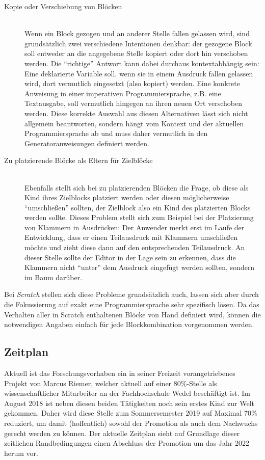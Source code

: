 \documentclass[paper=a4,fontsize=11pt,parskip=half]{scrartcl}
\begin{document}
\begin{description}
\item[Kopie oder Verschiebung von Blöcken] \hfill\\
  Wenn ein Block gezogen und an anderer Stelle fallen gelassen wird, sind grundsätzlich zwei verschiedene Intentionen denkbar: der gezogene Block soll entweder an die angegebene Stelle kopiert oder dort hin verschoben werden. Die \enquote{richtige} Antwort kann dabei durchaus kontextabhängig sein: Eine deklarierte Variable soll, wenn sie in einem Ausdruck fallen gelassen wird, dort vermutlich eingesetzt (also kopiert) werden. Eine konkrete Anweisung in einer imperativen Programmiersprache, z.B. eine Textausgabe, soll vermutlich hingegen an ihren neuen Ort verschoben werden. Diese korrekte Auswahl aus diesen Alternativen lässt sich nicht allgemein beantworten, sondern hängt vom Kontext und der aktuellen Programmiersprache ab und muss daher vermutlich in den Generatoranweisungen definiert werden.
\item[Zu platzierende Blöcke als Eltern für Zielblöcke] \hfill\\
  Ebenfalls stellt sich bei zu platzierenden Blöcken die Frage, ob diese als Kind ihres Zielblocks platziert werden oder diesen möglicherweise \enquote{umschließen} sollten, der Zielblock also ein Kind des platzierten Blocks werden sollte. Dieses Problem stellt sich zum Beispiel bei der Platzierung von Klammern in Ausdrücken: Der Anwender merkt erst im Laufe der Entwicklung, dass er einen Teilausdruck mit Klammern umschließen möchte und zieht diese dann auf den entsprechenden Teilausdruck. An dieser Stelle sollte der Editor in der Lage sein zu erkennen, dass die Klammern nicht \enquote{unter} dem Ausdruck eingefügt werden sollten, sondern im Baum darüber.
\end{description}

Bei \textit{Scratch} stellen sich diese Probleme grundsätzlich auch, lassen sich aber durch die Fokussierung auf exakt eine Programmiersprache sehr spezifisch lösen. Da das Verhalten aller in Scratch enthaltenen Blöcke von Hand definiert wird, können die notwendigen Angaben einfach für jede Blockkombination vorgenommen werden.

\subsection{Zeitplan}

Aktuell ist das Forschungsvorhaben ein in seiner Freizeit vorangetriebenes Projekt von Marcus Riemer, welcher aktuell auf einer 80\%-Stelle als wissenschaftlicher Mitarbeiter an der Fachhochschule Wedel beschäftigt ist. Im August 2018 ist neben diesen beiden Tätigkeiten noch sein erstes Kind zur Welt gekommen. Daher wird diese Stelle zum Sommersemester 2019 auf Maximal 70\% reduziert, um damit (hoffentlich) sowohl der Promotion als auch dem Nachwuchs gerecht werden zu können. Der aktuelle Zeitplan sieht auf Grundlage dieser zeitlichen Randbedingungen einen Abschluss der Promotion um das Jahr 2022 herum vor.
\end{document}
